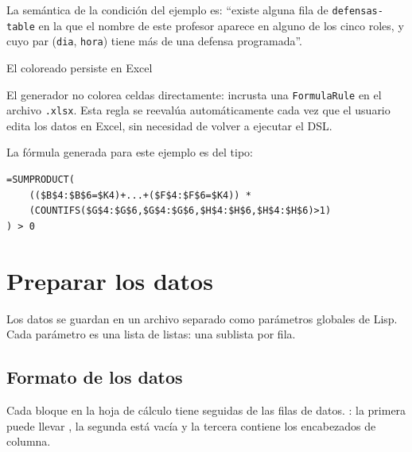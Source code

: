 \documentclass[12pt,a4paper]{report}
\begin{document}
La semántica de la condición del ejemplo es: ``existe alguna fila de
\texttt{defensas-table} en la que el nombre de este profesor aparece en
alguno de los cinco roles, y cuyo par (\texttt{dia}, \texttt{hora}) tiene
más de una defensa programada''.

\begin{infobox}{El coloreado persiste en Excel}
  
El generador no colorea celdas directamente: incrusta una
\texttt{FormulaRule} en el archivo \texttt{.xlsx}.
Esta regla se reevalúa automáticamente cada vez que el usuario edita los
datos en Excel, sin necesidad de volver a ejecutar el DSL.

La fórmula generada para este ejemplo es del tipo:
\begin{lstlisting}[numbers=none, backgroundcolor=\color{gray!10},
                   basicstyle=\ttfamily\footnotesize, language={}]
=SUMPRODUCT(
    (($B$4:$B$6=$K4)+...+($F$4:$F$6=$K4)) *
    (COUNTIFS($G$4:$G$6,$G$4:$G$6,$H$4:$H$6,$H$4:$H$6)>1)
) > 0
\end{lstlisting}
\end{infobox}


\section{Preparar los datos}
\label{sec:datos}

Los datos se guardan en un archivo separado como parámetros globales de Lisp.
Cada parámetro es una lista de listas: una sublista por fila.

\subsection{Formato de los datos}

Cada bloque en la hoja de cálculo tiene 
seguidas de las filas de datos. : la primera puede llevar ,
la segunda está vacía y la tercera contiene los encabezados de columna.
\end{document}
